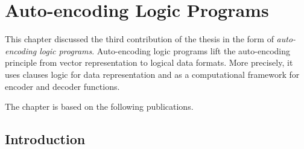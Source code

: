 \chapter{Auto-encoding Logic Programs}\label{ch:alps}


This chapter discussed the third contribution of the thesis in the form of \textit{auto-encoding logic programs}.
Auto-encoding logic programs lift the auto-encoding principle from vector representation to logical data formats.
More precisely, it uses clauses logic for data representation and  as a computational framework for encoder and decoder functions.


The chapter is based on the following publications.

\begin{quote}
\end{quote}

\begin{quote}
\end{quote}



\section{Introduction}




